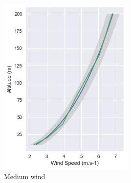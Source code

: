 \documentclass[a4paper,11pt]{kth-mag}
\begin{document}
\begin{figure}
\begin{subfigure}[t]{0.32\textwidth}
        \includegraphics[width=\textwidth]{images/gp_profile_med}
        \caption{Medium wind}
        \label{fig:gp_profile_med}
    \end{subfigure}
    \hfill
    \begin{subfigure}[t]{0.32\textwidth}
        \centering

\end{subfigure}
\end{figure}
\end{document}
